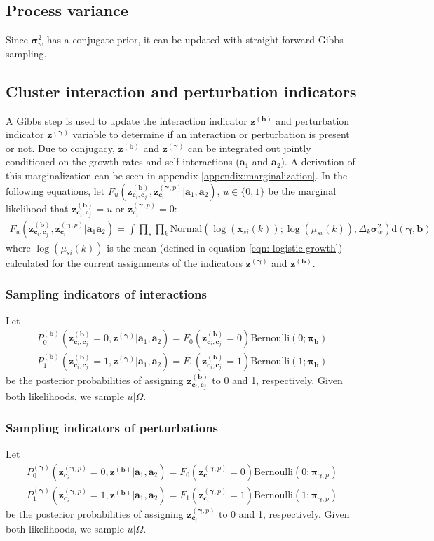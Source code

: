 \documentclass{article}
\newcommand{\Normaldist}{\text{Normal}}
\newcommand{\Bernoullidist}{\text{Bernoulli}}
\newcommand{\ci}[1]{\mathbf{c}_{#1}}
\newcommand{\growth}{\mathbf{a}_1}
\newcommand{\si}{\mathbf{a}_2}
\newcommand{\interact}{\mathbf{b}}
\newcommand{\zinteract}{\mathbf{z}^{(\interact)}}
\newcommand{\zinteractcij}[2]{\mathbf{z}^{(\interact)}_{\ci{#1}, \ci{#2}}}
\newcommand{\probinteract}{\mathbf{\pi}_{\interact}}
\newcommand{\pert}{\mathbf{\gamma}}
\newcommand{\zpert}{\mathbf{z}^{(\pert)}}
\newcommand{\zpertic}[2]{\mathbf{z}^{(\pert, #1)}_{\ci{#2}}}
\newcommand{\probperti}[1]{\mathbf{\pi}_{\pert, #1}}
\newcommand{\pv}{\mathbf{\sigma}_w^2}
\newcommand{\musik}[3]{\mu_{#1 #2}(#3)}
\newcommand{\xsik}[3]{\mathbf{x}_{#1 #2}(#3)}
\newcommand{\dt}{\Delta_k}
\begin{document}
\subsection{Process variance}
Since $\pv$ has a conjugate prior, it can be updated with straight forward Gibbs sampling.

\subsection{Cluster interaction and perturbation indicators}
A Gibbs step is used to update the interaction indicator $\zinteract$ and perturbation indicator $\zpert$ variable to determine if an interaction or perturbation is present or not. Due to conjugacy, $\zinteract$ and $\zpert$ can be integrated out jointly conditioned on the growth rates and self-interactions ($\growth$ and $\si$). A derivation of this marginalization can be seen in appendix \ref{appendix:marginalization}. In the following equations, let $F_u (\zinteractcij{i}{j} , \zpertic{p}{i} | \growth, \si)$, $u \in \{ 0, 1 \}$ be the marginal likelihood that $\zinteractcij{i}{j} = u$ or $\zpertic{p}{i} = 0$:
\begin{align}
    F_u ( \zinteractcij{i}{j}, \zpertic{p}{i} | \growth \si) = \int \prod_{s} \prod_{k} 
        \Normaldist \left( 
            \log ( \xsik{s}{i}{k} ) ; 
            \log (\musik{s}{i}{k} ) , 
            \dt \pv \right) 
        \text{d}(\pert, \interact)
\end{align}
where $\log (\musik{s}{i}{k} )$ is the mean (defined in equation \ref{eqn: logistic growth}) calculated for the current assignments of the indicators $\zpert$ and $\zinteract$.
\subsubsection{Sampling indicators of interactions}
Let
\begin{align}
    P_0^{(\interact)} ( \zinteractcij{i}{j} = 0 , 
        \zpert | \growth , \si) = F_0 (\zinteractcij{i}{j} = 0) \Bernoullidist (0 ; \probinteract) \\
    P_1^{(\interact)} ( \zinteractcij{i}{j} = 1 , 
        \zpert | \growth , \si) = F_1 (\zinteractcij{i}{j} = 1) \Bernoullidist (1 ; \probinteract)
\end{align}
be the posterior probabilities of assigning $\zinteractcij{i}{j}$ to 0 and 1, respectively. Given both likelihoods, we sample $u | \Omega$.

\subsubsection{Sampling indicators of perturbations}
Let
\begin{align}
    P_0^{(\pert)} ( \zpertic{p}{i} = 0 , 
        \zinteract | \growth , \si) = F_0 (\zpertic{p}{i} = 0) \Bernoullidist (0 ; \probperti{p}) \\
    P_1^{(\pert)} ( \zpertic{p}{i} = 1 , 
        \zinteract | \growth , \si) = F_1 (\zpertic{p}{i} = 1) \Bernoullidist (1 ; \probperti{p})
\end{align}
be the posterior probabilities of assigning $\zpertic{p}{i}$ to 0 and 1, respectively. Given both likelihoods, we sample $u | \Omega$.
\end{document}
